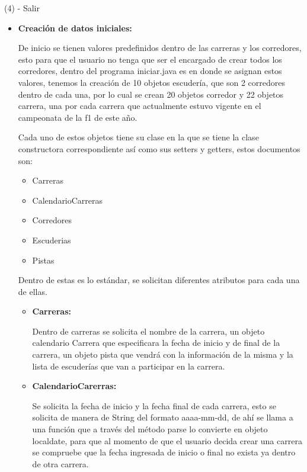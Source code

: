 \documentclass[12pt, letterpaper]{article} %
\begin{document}
(4) - Salir
\vspace{10mm} 

\begin{itemize}
    \item \textbf{Creación de datos iniciales:}
    
    De inicio se tienen valores predefinidos dentro de las carreras y los corredores, esto para que el usuario no tenga que ser el encargado de crear todos los corredores, dentro del programa iniciar.java es en donde se asignan estos valores, tenemos la creación de 10 objetos escudería, que son 2 corredores dentro de cada una, por lo cual se crean 20 objetos corredor y 22 objetos carrera, una por cada carrera que actualmente estuvo vigente en el campeonata de la f1 de este año.
    \vspace{5mm}
    
    Cada uno de estos objetos tiene su clase en la que se tiene la clase constructora correspondiente así como sus setters y getters, estos documentos son:
    \begin{itemize}
        \item Carreras
        \item CalendarioCarreras
        \item Corredores
        \item Escuderias
        \item Pistas
    \end{itemize}
    Dentro de estas es lo estándar, se solicitan diferentes atributos para cada una de ellas.

    \begin{itemize}
        \item \textbf{Carreras:}
        
        Dentro de carreras se solicita el nombre de la carrera, un objeto calendario Carrera que especificara la fecha de inicio y de final de la carrera, un objeto pista que vendrá con la información de la misma y la lista de escuderías que van a participar en la carrera.
        \vspace{5mm}
        
        \item \textbf{CalendarioCarerras:}
        
        Se solicita la fecha de inicio y la fecha final de cada carrera, esto se solicita de manera de String del formato aaaa-mm-dd, de ahí se llama a una función que a través del método parse lo convierte en objeto localdate, para que al momento de que el usuario decida crear una carrera se compruebe que la fecha ingresada de inicio o final no exista ya dentro de otra carrera.
        \vspace{5mm}
        

\end{itemize}
\end{itemize}
\end{document}

